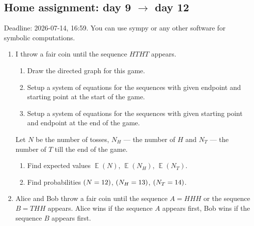 \documentclass[12pt]{article}
\let\P\relax
\DeclareMathOperator{\P}{\mathbb{P}}
\DeclareMathOperator{\E}{\mathbb{E}}
\begin{document}





\subsection*{Home assignment: day 9 $\to$ day 12}

Deadline: 2026-07-14, 16:59. 
You can use sympy or any other software for symbolic computations.

\begin{enumerate}
\item I throw a fair coin until the sequence $HTHT$ appears.

\begin{enumerate}[label=\alph*)]
    \item Draw the directed graph for this game.
    \item Setup a system of equations for the sequences with given endpoint and starting point at the start of the game. 
    \item Setup a system of equations for the sequences with given starting point and endpoint at the end of the game. 
\end{enumerate}
Let $N$ be the number of tosses, $N_H$ — the number of $H$ and $N_T$ — the number of $T$ till the end of the game. 
\begin{enumerate}[label=\alph*), resume]
    \item Find expected values $\E(N)$, $\E(N_H)$, $\E(N_T)$.
    \item Find probabilities $\P(N = 12)$, $\P(N_H = 13)$, $\P(N_T = 14)$.
\end{enumerate}
    \item Alice and Bob throw a fair coin until the sequence $A = HHH$ or the sequence $B = THH$ appears.
Alice wins if the sequence $A$ appears first, Bob wins if the sequence $B$ appears first.


\end{enumerate}
\end{document}
